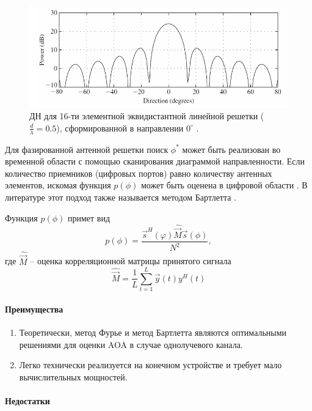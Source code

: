 \begin{figure}[ht!]
    \centering
    \includegraphics[width=\linewidth]{figs/fig3.9}
    \caption{ДН для 16-ти элементной эквидистантной линейной
        решетки ($\frac{d}{\lambda}=0.5$), сформированной в направлении $0^\circ$
        \cite{Tuncer2009}. }
    \label{fig:3.9}
\end{figure}

Для фазированной антенной решетки поиск $\phi^*$ может быть реализован во временной
области с помощью сканирования диаграммой направленности. Если количество
приемников (цифровых портов) равно количеству антенных элементов, искомая
функция $p(\phi)$ может быть оценена в цифровой области \cite{Stoica2005}.  В
литературе этот подход также называется методом Бартлетта \cite{Godara2004}.

Функция $p(\phi)$ примет вид
\begin{equation}
    p(\phi) = \frac{\vec s^H(\varphi) \hat{\vec M} \vec s (\phi)}{N^2},
\end{equation}
где $\hat{\vec M}$ -- оценка корреляционной матрицы принятого сигнала
\begin{equation}
    \label{eq:3.7}
    \hat{\vec M} = \frac{1}{L} \sum\limits_{t=1}^{L} \vec y(t) y^H (t)
\end{equation}

\paragraph{Преимущества}%
\begin{enumerate}
    \item Теоретически, метод Фурье и метод Бартлетта являются оптимальными
          решениями для оценки AOA в случае однолучевого канала.
    \item Легко технически реализуется на конечном устройстве и требует мало
          вычислительных мощностей.
\end{enumerate}

\paragraph{Недостатки}%

